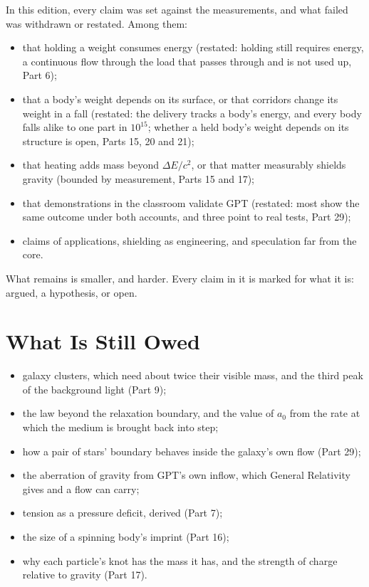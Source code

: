 \documentclass[11pt,a4paper]{article}
\begin{document}
 In this edition, every claim was set against the measurements, and what failed was withdrawn or restated. Among them:
\begin{itemize}
\item that holding a weight consumes energy (restated: holding still requires energy, a continuous flow through the load that passes through and is not used up, Part 6);
\item that a body's weight depends on its surface, or that corridors change its weight in a fall (restated: the delivery tracks a body's energy, and every body falls alike to one part in $10^{15}$; whether a held body's weight depends on its structure is open, Parts 15, 20 and 21);
\item that heating adds mass beyond $\Delta E/c^2$, or that matter measurably shields gravity (bounded by measurement, Parts 15 and 17);
\item that demonstrations in the classroom validate GPT (restated: most show the same outcome under both accounts, and three point to real tests, Part 29);
\item claims of applications, shielding as engineering, and speculation far from the core.
\end{itemize}
What remains is smaller, and harder. Every claim in it is marked for what it is: argued, a hypothesis, or open.

\section{What Is Still Owed}

\begin{itemize}
\item galaxy clusters, which need about twice their visible mass, and the third peak of the background light (Part 9);
\item the law beyond the relaxation boundary, and the value of $a_0$ from the rate at which the medium is brought back into step;
\item how a pair of stars' boundary behaves inside the galaxy's own flow (Part 29);
\item the aberration of gravity from GPT's own inflow, which General Relativity gives and a flow can carry;
\item tension as a pressure deficit, derived (Part 7);
\item the size of a spinning body's imprint (Part 16);
\item why each particle's knot has the mass it has, and the strength of charge relative to gravity (Part 17).
\end{itemize}
\end{document}
